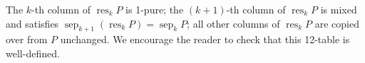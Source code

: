 \documentclass[numbers=enddot,12pt,final,onecolumn,notitlepage]{scrartcl}%
\theoremstyle{definition}
\begin{document}
\begin{itemize}
The $k$-th column of $\operatorname*{res}_{k}P$ is 1-pure; the $\left(  k+1\right)  $-th column of $\operatorname*{res}%
\nolimits_{k}P$ is mixed and satisfies $\operatorname*{sep}\nolimits_{k+1}%
\left(  \operatorname*{res}\nolimits_{k}P\right)  =\operatorname*{sep}%
\nolimits_{k}P$; all other columns of $\operatorname*{res}\nolimits_{k}P$ are
copied over from $P$ unchanged. We encourage the reader to check that
this 12-table is well-defined.



\end{itemize}
\end{document}
